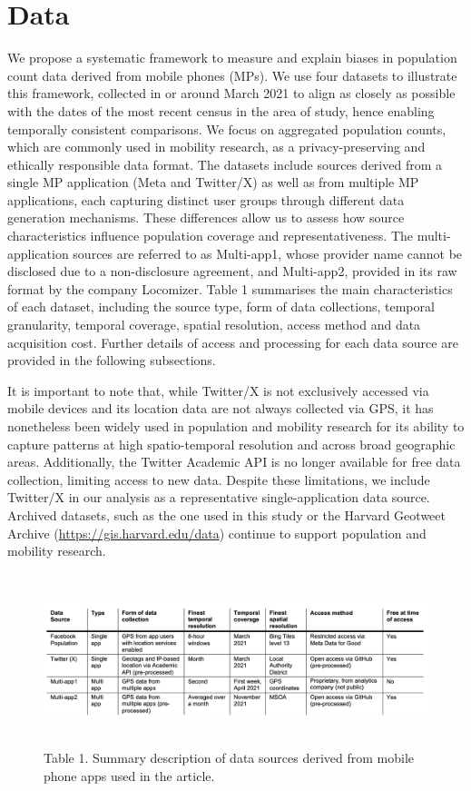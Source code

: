 \documentclass[]{rsos}%
\begin{document}
\section{Data}\label{sec-data}

We propose a systematic framework to measure and explain biases in
population count data derived from mobile phones (MPs). We use four
datasets to illustrate this framework, collected in or around March 2021
to align as closely as possible with the dates of the most recent census
in the area of study, hence enabling temporally consistent comparisons.
We focus on aggregated population counts, which are commonly used in
mobility research, as a privacy-preserving and ethically responsible
data format. The datasets include sources derived from a single MP
application (Meta and Twitter/X) as well as from multiple MP
applications, each capturing distinct user groups through different data
generation mechanisms. These differences allow us to assess how source
characteristics influence population coverage and representativeness.
The multi-application sources are referred to as Multi-app1, whose
provider name cannot be disclosed due to a non-disclosure agreement, and
Multi-app2, provided in its raw format by the company Locomizer. Table 1
summarises the main characteristics of each dataset, including the
source type, form of data collections, temporal granularity, temporal
coverage, spatial resolution, access method and data acquisition cost.
Further details of access and processing for each data source are
provided in the following subsections.

It is important to note that, while Twitter/X is not exclusively
accessed via mobile devices and its location data are not always
collected via GPS, it has nonetheless been widely used in population and
mobility research for its ability to capture patterns at high
spatio-temporal resolution and across broad geographic areas.
Additionally, the Twitter Academic API is no longer available for free
data collection, limiting access to new data. Despite these limitations,
we include Twitter/X in our analysis as a representative
single-application data source. Archived datasets, such as the one used
in this study or the Harvard Geotweet Archive
(\url{https://gis.harvard.edu/data}) continue to support population and
mobility research.

\begin{figure}
\centering
\includegraphics[width=5.20833in,height=1.97917in]{figures/table-data-source.png}
\caption{Table 1. Summary description of data sources derived from mobile phone
apps used in the article.}
\end{figure}
\end{document}
